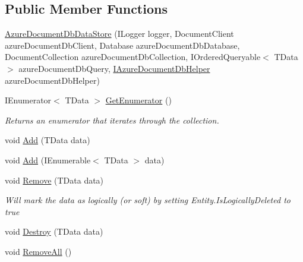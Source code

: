 \subsection*{Public Member Functions}
\begin{DoxyCompactItemize}
\item 
\hyperlink{classCqrs_1_1Azure_1_1DocumentDb_1_1DataStores_1_1AzureDocumentDbDataStore_add3f66df634a9e9ca0cbd4498e4478f6}{Azure\+Document\+Db\+Data\+Store} (I\+Logger logger, Document\+Client azure\+Document\+Db\+Client, Database azure\+Document\+Db\+Database, Document\+Collection azure\+Document\+Db\+Collection, I\+Ordered\+Queryable$<$ T\+Data $>$ azure\+Document\+Db\+Query, \hyperlink{interfaceCqrs_1_1Azure_1_1DocumentDb_1_1IAzureDocumentDbHelper}{I\+Azure\+Document\+Db\+Helper} azure\+Document\+Db\+Helper)
\item 
I\+Enumerator$<$ T\+Data $>$ \hyperlink{classCqrs_1_1Azure_1_1DocumentDb_1_1DataStores_1_1AzureDocumentDbDataStore_af83791e306b51fd3ee0b710232e83756}{Get\+Enumerator} ()
\begin{DoxyCompactList}\small\item\em Returns an enumerator that iterates through the collection. \end{DoxyCompactList}\item 
void \hyperlink{classCqrs_1_1Azure_1_1DocumentDb_1_1DataStores_1_1AzureDocumentDbDataStore_ad17e6e846430e617af24be48b77d1528}{Add} (T\+Data data)
\item 
void \hyperlink{classCqrs_1_1Azure_1_1DocumentDb_1_1DataStores_1_1AzureDocumentDbDataStore_a2d91050f17273687e44a121623803e7a}{Add} (I\+Enumerable$<$ T\+Data $>$ data)
\item 
void \hyperlink{classCqrs_1_1Azure_1_1DocumentDb_1_1DataStores_1_1AzureDocumentDbDataStore_abf9bcf75e8e0e1ec86155bf4da1a7b7a}{Remove} (T\+Data data)
\begin{DoxyCompactList}\small\item\em Will mark the {\itshape data}  as logically (or soft) by setting Entity.\+Is\+Logically\+Deleted to true \end{DoxyCompactList}\item 
void \hyperlink{classCqrs_1_1Azure_1_1DocumentDb_1_1DataStores_1_1AzureDocumentDbDataStore_affe39fe57e590555256258fa6c568c29}{Destroy} (T\+Data data)
\item 
void \hyperlink{classCqrs_1_1Azure_1_1DocumentDb_1_1DataStores_1_1AzureDocumentDbDataStore_a0d72cc318e98e01b3dbed86d412a8778}{Remove\+All} ()
\item 

\end{DoxyCompactItemize}
